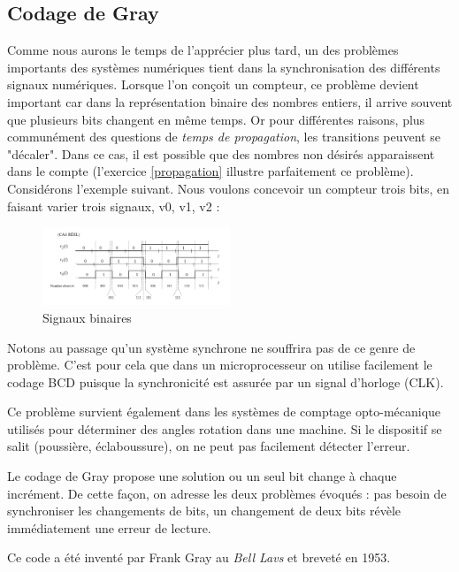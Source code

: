 \documentclass[a4paper,11pt]{book}
\theoremstyle{definition}
\begin{document}
\subsection{Codage de Gray}
Comme nous aurons le temps de l’apprécier plus tard, un des problèmes importants des systèmes numériques tient dans la synchronisation des différents signaux numériques. Lorsque l’on conçoit un compteur, ce problème devient important car dans la représentation binaire des nombres entiers, il arrive souvent que plusieurs bits changent en même temps. Or pour différentes raisons, plus communément des questions de \textit{temps de propagation}, les transitions peuvent se "décaler". Dans ce cas, il est possible que des nombres non désirés apparaissent dans le compte (l'exercice \ref{propagation} illustre parfaitement ce problème).
Considérons l’exemple suivant. Nous voulons concevoir un compteur trois bits, en faisant varier trois signaux, v0, v1, v2 :
\begin{figure}[h]
\centering
\includegraphics[width=0.5\textwidth]{media/SignauxBinaires_Sync.png}
\caption{Signaux binaires}
\end{figure}

Notons au passage qu'un système synchrone ne souffrira pas de ce genre de problème. C'est pour cela que dans un microprocesseur on utilise facilement le codage BCD puisque la synchronicité est assurée par un signal d'horloge (CLK).

Ce problème survient également dans les systèmes de comptage opto-mécanique utilisés pour déterminer des angles rotation dans une machine. Si le dispositif se salit (poussière, éclaboussure), on ne peut pas facilement détecter l'erreur.

Le codage de Gray propose une solution ou un seul bit change à chaque incrément. De cette façon, on adresse les deux problèmes évoqués : pas besoin de synchroniser les changements de bits, un changement de deux bits révèle immédiatement une erreur de lecture.

Ce code a été inventé par Frank Gray au \textit{Bell Lavs} et breveté en 1953.
\end{document}
